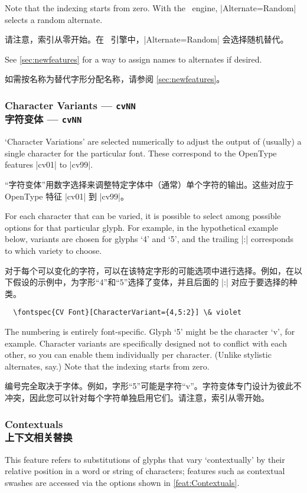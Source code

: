\documentclass[a4paper]{l3doc}
\begin{document}
Note that the indexing starts from zero.
With the \LuaTeX\ engine, |Alternate=Random| selects a random alternate.

请注意，索引从零开始。在 \LuaTeX\ 引擎中，|Alternate=Random| 会选择随机替代。

See \vref{sec:newfeatures} for a way to assign names to alternates if desired.

如需按名称为替代字形分配名称，请参阅 \vref{sec:newfeatures}。

\subsubsection{Character Variants --- \texttt{cvNN}\\字符变体 --- \texttt{cvNN}}

`Character Variations' are selected
numerically to adjust the output of (usually) a single character for the
particular font. These correspond to the OpenType features |cv01| to |cv99|.

“字符变体”用数字选择来调整特定字体中（通常）单个字符的输出。这些对应于 OpenType 特征 |cv01| 到 |cv99|。

For each character that can be varied, it is possible to select among
possible options for that particular glyph.
For example, in the hypothetical example below, variants are chosen for glyphs `4' and `5',
and the trailing |:| corresponds to which variety to choose.

对于每个可以变化的字符，可以在该特定字形的可能选项中进行选择。例如，在以下假设的示例中，为字形“4”和“5”选择了变体，并且后面的 |:| 对应于要选择的种类。

\begin{Verbatim}
  \fontspec{CV Font}[CharacterVariant={4,5:2}] \& violet
\end{Verbatim}
The numbering is entirely font-specific. Glyph `5' might be the character `v', for example.
Character variants are specifically designed not to conflict with each
other, so you can enable them individually per character.
(Unlike stylistic alternates, say.)
Note that the indexing starts from zero.

编号完全取决于字体。例如，字形“5”可能是字符“v”。字符变体专门设计为彼此不冲突，因此您可以针对每个字符单独启用它们。请注意，索引从零开始。

\subsubsection{Contextuals\\上下文相关替换}
This feature refers to substitutions of glyphs that vary `contextually' by their relative position in a word or string of characters;
features such as contextual swashes are accessed via the options shown in \ref{feat:Contextuals}.
\end{document}
